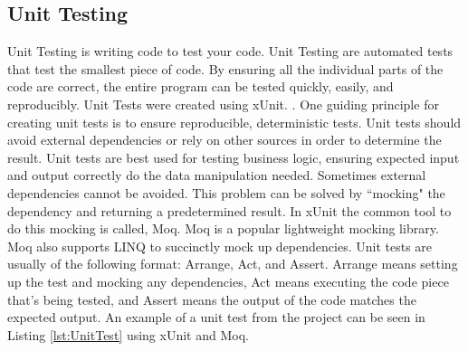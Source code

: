 \subsection{Unit Testing}
Unit Testing is writing code to test your code. Unit Testing are automated tests that test the smallest piece of code. By ensuring all the individual parts of the code are correct, the entire program can be tested quickly, easily, and reproducibly. Unit Tests were created using xUnit. . One guiding principle for creating unit tests is to ensure reproducible, deterministic tests. Unit tests should avoid external dependencies or rely on other sources in order to determine the result. Unit tests are best used for testing business logic, ensuring expected input and output correctly do the data manipulation needed. Sometimes external dependencies cannot be avoided. This problem can be solved by ``mocking" the dependency and returning a predetermined result. In xUnit the common tool to do this mocking is called, Moq. Moq is a popular lightweight mocking library. Moq also supports LINQ to succinctly mock up dependencies. Unit tests are usually of the following format: Arrange, Act, and Assert. Arrange means setting up the test and mocking any dependencies, Act means executing the code piece that's being tested, and Assert means the output of the code matches the expected output. An example of a unit test from the project can be seen in Listing \ref{lst:UnitTest} using xUnit and Moq.
